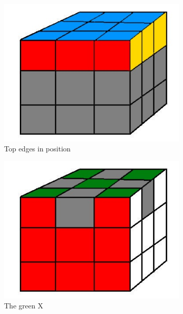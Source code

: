 \documentclass[a4paper,11pt]{kth-mag}
\begin{document}
\begin{figure}[bh]
	\centering
	\begin{subfigure}[!b]{0.3\textwidth}
		\includegraphics[width=\textwidth]{figs/rubiks-top-edges.jpg}
		\caption{Top edges in position}
		\label{fig_12}
	\end{subfigure}
	\begin{subfigure}[!b]{0.3\textwidth}
		\includegraphics[width=\textwidth]{figs/rubiks-bottom-edges.jpg}
		\caption{The green X}
		\label{fig_13}
	\end{subfigure}
	\begin{subfigure}[!b]{0.3\textwidth}

\end{subfigure}
\end{figure}
\end{document}
